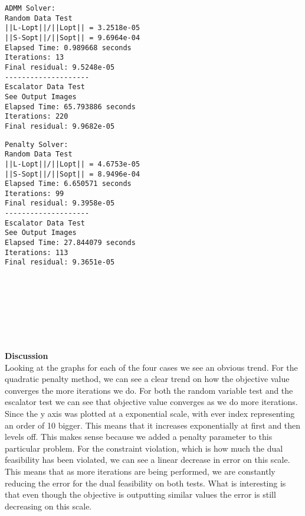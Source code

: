 \documentclass[12pt]{article}
\begin{document}
\begin{minipage}{0.5\textwidth}
 \begin{verbatim}
ADMM Solver:
Random Data Test
||L-Lopt||/||Lopt|| = 3.2518e-05
||S-Sopt||/||Sopt|| = 9.6964e-04
Elapsed Time: 0.989668 seconds
Iterations: 13
Final residual: 9.5248e-05
--------------------
Escalator Data Test
See Output Images
Elapsed Time: 65.793886 seconds
Iterations: 220
Final residual: 9.9682e-05
 \end{verbatim}
\end{minipage}
\begin{minipage}{0.5\textwidth}
 \begin{verbatim}
Penalty Solver:
Random Data Test
||L-Lopt||/||Lopt|| = 4.6753e-05
||S-Sopt||/||Sopt|| = 8.9496e-04
Elapsed Time: 6.650571 seconds
Iterations: 99
Final residual: 9.3958e-05
--------------------
Escalator Data Test
See Output Images
Elapsed Time: 27.844079 seconds
Iterations: 113
Final residual: 9.3651e-05
 \end{verbatim}
\end{minipage}
\newpage
\begin{figure}[H]%
   \centering
   \\
   \\
   \\
   \\
\end{figure}
\newpage
\begin{figure}[H]%
   \centering
   \\
\end{figure}

\newpage
\textbf{Discussion}\\
Looking at the graphs for each of the four cases we see an obvious trend. For the quadratic penalty method, we can see a clear trend on how the objective value converges the more iterations we do. For both the random variable test and the escalator test we can see that objective value converges as we do more iterations. Since the y axis was plotted at a exponential scale, with ever index representing an order of 10 bigger. This means that it increases exponentially at first and then levels off. This makes sense because we added a penalty parameter to this particular problem. For the constraint violation, which is how much the dual feasibility has been violated, we can see a linear decrease in error on this scale. This means that as more iterations are being performed, we are constantly reducing the error for the dual feasibility on both tests. What is interesting is that even though the objective is outputting similar values the error is still decreasing on this scale.
\end{document}
